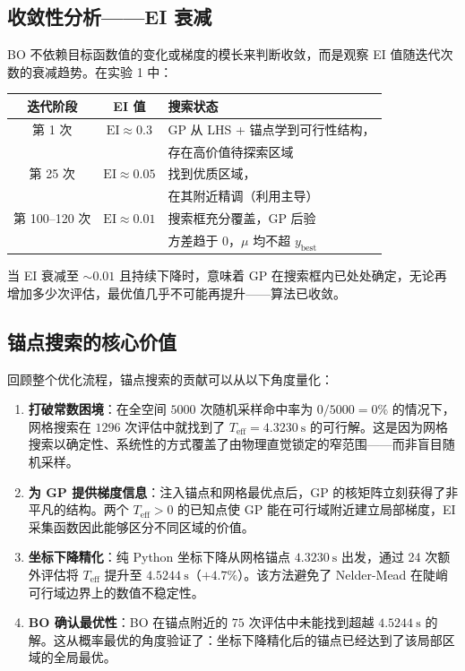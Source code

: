 \documentclass[12pt,a4paper]{ctexart}
\newcommand{\Teff}{T_{\text{eff}}}
\newcommand{\EI}{\mathrm{EI}}
\begin{document}
\subsection{收敛性分析——EI 衰减}

BO 不依赖目标函数值的变化或梯度的模长来判断收敛，而是观察 EI 值随迭代次数的衰减趋势。在实验 1 中：

\begin{center}
\begin{tabular}{c|c|p{5.5cm}}
\toprule
\textbf{迭代阶段} & \textbf{EI 值} & \textbf{搜索状态} \\
\midrule
第 1 次    & $\EI \approx 0.3$   & GP 从 LHS + 锚点学到可行性结构，\\
           &                     & 存在高价值待探索区域 \\
第 25 次   & $\EI \approx 0.05$  & 找到优质区域，\\
           &                     & 在其附近精调（利用主导） \\
第 100--120 次 & $\EI \approx 0.01$  & 搜索框充分覆盖，GP 后验\\
           &                     & 方差趋于 0，$\mu$ 均不超 $y_{\text{best}}$ \\
\bottomrule
\end{tabular}
\end{center}

当 EI 衰减至 $\sim 0.01$ 且持续下降时，意味着 GP 在搜索框内已处处确定，无论再增加多少次评估，最优值几乎不可能再提升——算法已收敛。

\subsection{锚点搜索的核心价值}

回顾整个优化流程，锚点搜索的贡献可以从以下角度量化：

\begin{enumerate}[label=(\arabic*), leftmargin=*]
    \item \textbf{打破常数困境}：在全空间 $5000$ 次随机采样命中率为 $0/5000 = 0\%$ 的情况下，网格搜索在 $1296$ 次评估中就找到了 $\Teff = 4.3230\ \mathrm{s}$ 的可行解。这是因为网格搜索以确定性、系统性的方式覆盖了由物理直觉锁定的窄范围——而非盲目随机采样。
    \item \textbf{为 GP 提供梯度信息}：注入锚点和网格最优点后，GP 的核矩阵立刻获得了非平凡的结构。两个 $\Teff > 0$ 的已知点使 GP 能在可行域附近建立局部梯度，EI 采集函数因此能够区分不同区域的价值。
    \item \textbf{坐标下降精化}：纯 Python 坐标下降从网格锚点 $4.3230\ \mathrm{s}$ 出发，通过 24 次额外评估将 $\Teff$ 提升至 $4.5244\ \mathrm{s}$（$+4.7\%$）。该方法避免了 Nelder-Mead 在陡峭可行域边界上的数值不稳定性。
    \item \textbf{BO 确认最优性}：BO 在锚点附近的 $75$ 次评估中未能找到超越 $4.5244\ \mathrm{s}$ 的解。这从概率最优的角度验证了：坐标下降精化后的锚点已经达到了该局部区域的全局最优。
\end{enumerate}
\end{document}
